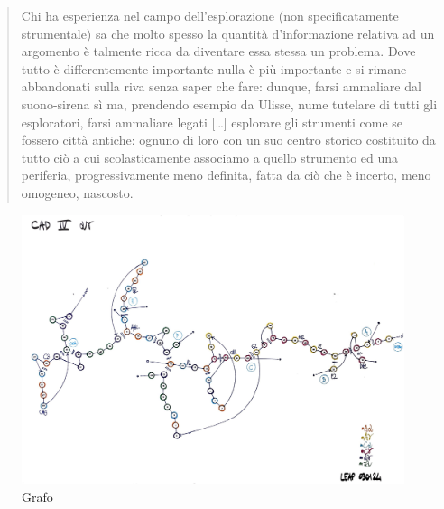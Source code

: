 \documentclass{gs-adonis}
\begin{document}
\begin{quote}
  Chi ha esperienza nel campo dell’esplorazione (non specificatamente
  strumentale) sa che molto spesso la quantità d’informazione relativa ad un
  argomento è talmente ricca da diventare essa stessa un problema. Dove tutto è
  differentemente importante nulla è più importante e si rimane abbandonati
  sulla riva senza saper che fare: dunque, farsi ammaliare dal suono-sirena sì
  ma, prendendo esempio da Ulisse, nume tutelare di tutti gli esploratori,
  farsi ammaliare legati [\ldots] esplorare gli strumenti come se fossero città
  antiche: ognuno di loro con un suo centro storico costituito da tutto ciò a
  cui scolasticamente associamo a quello strumento ed una periferia,
  progressivamente meno definita, fatta da ciò che è incerto, meno omogeneo,
  nascosto. \cite{netti23}
\end{quote}

\begin{figure}[t]
  \centering
  \includegraphics[width=\linewidth]{images/CAD-IV-GRAFO-ANNOTATO.pdf}
  \captionsetup{width=.81\linewidth}
  \caption{Grafo}
  \label{grafo}
\end{figure}


%
\end{document}
